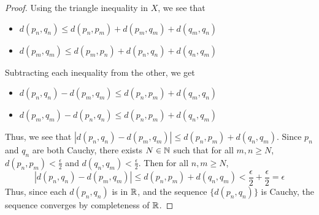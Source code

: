\documentclass[11pt]{article}
\begin{document}
\begin{exercise}{23}
    \begin{proof}
        Using the triangle inequality in $X$, we see that \begin{itemize}
        \item $d(p_n, q_n) \le d(p_n, p_m) + d(p_m, q_m) + d(q_m, q_n)$
        \item $d(p_m, q_m) \le d(p_m, p_n) + d(p_n, q_n) + d(q_n, q_m)$
    \end{itemize}
    Subtracting each inequality from the other, we get \begin{itemize}
        \item $d(p_n, q_n) - d(p_m, q_m) \le d(p_n, p_m) + d(q_m, q_n)$
        \item $d(p_m, q_m) - d(p_n, q_n) \le d(p_n, p_m) + d(q_n, q_m)$
    \end{itemize}
    Thus, we see that $|d(p_n, q_n) - d(p_m, q_m)| \le d(p_n, p_m) + d(q_n, q_m)$. Since $p_n$ and $q_n$ are both Cauchy, there exists $N \in \mathbb{N}$ such that for all $m, n \ge N$, $d(p_n, p_m) < \frac{\epsilon}{2}$ and $d(q_n, q_m) < \frac{\epsilon}{2}$. Then for all $n, m \ge N$, $$|d(p_n, q_n) - d(p_m, q_m)| \le d(p_n, p_m) + d(q_n, q_m) < \frac{\epsilon}{2} + \frac{\epsilon}{2} = \epsilon$$
    Thus, since each $d(p_n, q_n)$ is in $\mathbb{R}$, and the sequence $\{ d(p_n, q_n) \}$ is Cauchy, the sequence converges by completeness of $\mathbb{R}$. 
    \end{proof}
\end{exercise}
\end{document}
